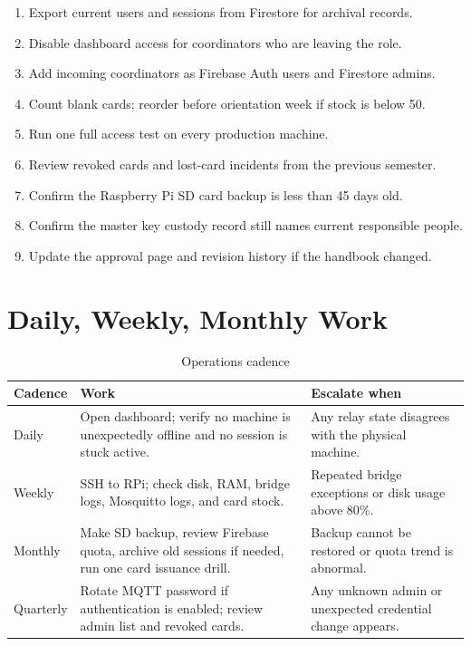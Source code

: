\begin{enumerate}[leftmargin=1.5em]
    \item Export current users and sessions from Firestore for archival records.
    \item Disable dashboard access for coordinators who are leaving the role.
    \item Add incoming coordinators as Firebase Auth users and Firestore admins.
    \item Count blank cards; reorder before orientation week if stock is below 50.
    \item Run one full access test on every production machine.
    \item Review revoked cards and lost-card incidents from the previous semester.
    \item Confirm the Raspberry Pi SD card backup is less than 45 days old.
    \item Confirm the master key custody record still names current responsible people.
    \item Update the approval page and revision history if the handbook changed.
\end{enumerate}

\section{Daily, Weekly, Monthly Work}

\begin{table}[H]
\centering
\caption{Operations cadence}
\begin{tabular}{L{2.5cm}L{8cm}L{3.5cm}}
\toprule
\textbf{Cadence} & \textbf{Work} & \textbf{Escalate when} \\
\midrule
Daily & Open dashboard; verify no machine is unexpectedly offline and no session is stuck active. & Any relay state disagrees with the physical machine. \\
Weekly & SSH to RPi; check disk, RAM, bridge logs, Mosquitto logs, and card stock. & Repeated bridge exceptions or disk usage above 80\%. \\
Monthly & Make SD backup, review Firebase quota, archive old sessions if needed, run one card issuance drill. & Backup cannot be restored or quota trend is abnormal. \\
Quarterly & Rotate MQTT password if authentication is enabled; review admin list and revoked cards. & Any unknown admin or unexpected credential change appears. \\
\bottomrule
\end{tabular}
\end{table}

